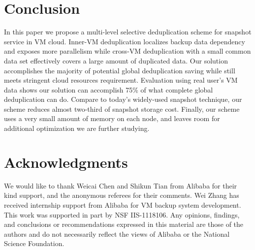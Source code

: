 \section{Conclusion}
\label{sect:final}
In this paper we propose a multi-level selective deduplication scheme for 
snapshot service in VM cloud. 
Inner-VM deduplication localizes backup data dependency and exposes more parallelism  
while cross-VM deduplication with a small common data set
effectively  covers a large amount of duplicated data.
Our solution accomplishes the majority of
potential global deduplication saving while still meets stringent cloud resources requirement. 
Evaluation using real user's VM data shows
our solution can accomplish 75\% of what complete global
deduplication can do. 
Compare to today's widely-used snapshot technique, our scheme reduces almost
two-third of snapshot storage cost.
Finally, our scheme uses a very small amount of memory on each node, and leaves
room for additional optimization we are further studying.
\section*{Acknowledgments}
{\small
We would like to thank Weicai Chen and Shikun Tian from Alibaba for their kind support, 
and the anonymous referees for their comments.
Wei Zhang has received internship support from Alibaba  for VM backup system development.
This work was supported in part by NSF IIS-1118106.
Any opinions, findings, and conclusions or recommendations expressed in this material are those of the authors and
do not necessarily reflect the views of Alibaba or the National Science Foundation.
}
 
%
%

